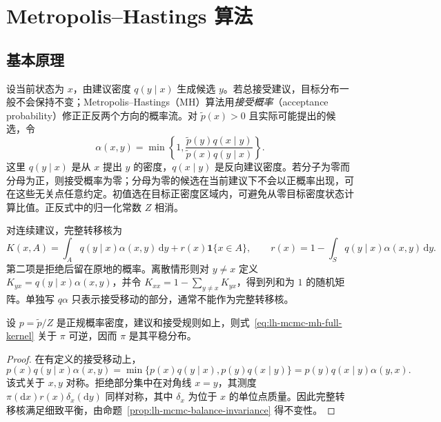 \section{Metropolis--Hastings 算法}
\label{sec:lh-mcmc-mh}

\subsection{基本原理}
\label{subsec:lh-mcmc-mh-principle}

设当前状态为 $x$，由建议密度 $q(y\mid x)$ 生成候选 $y$。若总接受建议，目标分布一般不会保持不变；Metropolis--Hastings（MH）算法用\emph{接受概率}（acceptance probability）修正正反两个方向的概率流。对 $\widetilde p(x)>0$ 且实际可能提出的候选，令
\begin{equation}
\alpha(x,y)=\min\left\{1,
\frac{\widetilde p(y)q(x\mid y)}{\widetilde p(x)q(y\mid x)}\right\}.
\label{eq:lh-mcmc-mh-acceptance}
\end{equation}
这里 $q(y\mid x)$ 是从 $x$ 提出 $y$ 的密度，$q(x\mid y)$ 是反向建议密度。若分子为零而分母为正，则接受概率为零；分母为零的候选在当前建议下不会以正概率出现，可在这些无关点任意约定。初值选在目标正密度区域内，可避免从零目标密度状态计算比值。正反式中的归一化常数 $Z$ 相消。

对连续建议，完整转移核为
\begin{equation}
K(x,A)=\int_Aq(y\mid x)\alpha(x,y)\,\mathrm dy
+r(x)\mathbf1\{x\in A\},\qquad
r(x)=1-\int_Sq(y\mid x)\alpha(x,y)\,\mathrm dy.
\label{eq:lh-mcmc-mh-full-kernel}
\end{equation}
第二项是拒绝后留在原地的概率。离散情形则对 $y\ne x$ 定义 $K_{yx}=q(y\mid x)\alpha(x,y)$，并令 $K_{xx}=1-\sum_{y\ne x}K_{yx}$，得到列和为 $1$ 的随机矩阵。单独写 $q\alpha$ 只表示接受移动的部分，通常不能作为完整转移核。

\begin{proposition}[MH 的细致平衡]
\label{prop:lh-mcmc-mh-balance}
设 $p=\widetilde p/Z$ 是正规概率密度，建议和接受规则如上，则式~\eqref{eq:lh-mcmc-mh-full-kernel} 关于 $\pi$ 可逆，因而 $\pi$ 是其平稳分布。
\end{proposition}
\begin{proof}
在有定义的接受移动上，
\begin{equation}
p(x)q(y\mid x)\alpha(x,y)
=\min\{p(x)q(y\mid x),p(y)q(x\mid y)\}
=p(y)q(x\mid y)\alpha(y,x).
\label{eq:lh-mcmc-mh-flow}
\end{equation}
该式关于 $x,y$ 对称。拒绝部分集中在对角线 $x=y$，其测度 $\pi(\mathrm dx)r(x)\delta_x(\mathrm dy)$ 同样对称，其中 $\delta_x$ 为位于 $x$ 的单位点质量。因此完整转移核满足细致平衡，由命题~\ref{prop:lh-mcmc-balance-invariance} 得不变性。
\end{proof}

